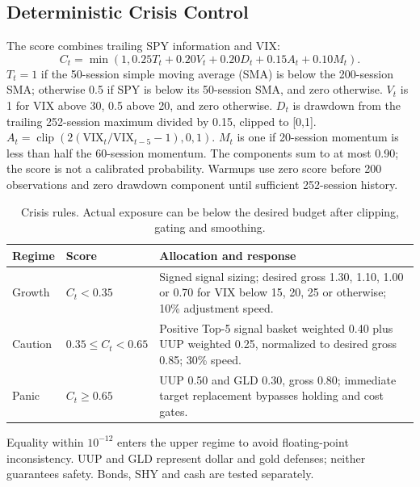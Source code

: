 \documentclass[3p,times]{elsarticle}
\begin{document}
\subsection{Deterministic Crisis Control}
The score combines trailing SPY information and VIX:
\begin{equation}C_t=\min(1,0.25T_t+0.20V_t+0.20D_t+0.15A_t+0.10M_t).\end{equation}
$T_t=1$ if the 50-session simple moving average (SMA) is below the 200-session SMA; otherwise 0.5 if SPY is below its 50-session SMA, and zero otherwise. $V_t$ is 1 for VIX above 30, 0.5 above 20, and zero otherwise. $D_t$ is drawdown from the trailing 252-session maximum divided by 0.15, clipped to [0,1]. $A_t=\operatorname{clip}(2(\mathrm{VIX}_t/\mathrm{VIX}_{t-5}-1),0,1)$. $M_t$ is one if 20-session momentum is less than half the 60-session momentum. The components sum to at most 0.90; the score is not a calibrated probability. Warmups use zero score before 200 observations and zero drawdown component until sufficient 252-session history.

\begin{table}[htbp]\centering\small
\caption{Crisis rules. Actual exposure can be below the desired budget after clipping, gating and smoothing.}\label{tab:crisis}
\begin{tabularx}{\textwidth}{llX}\toprule
Regime & Score & Allocation and response \\\midrule
Growth & $C_t<0.35$ & Signed signal sizing; desired gross 1.30, 1.10, 1.00 or 0.70 for VIX below 15, 20, 25 or otherwise; 10\% adjustment speed. \\
Caution & $0.35\le C_t<0.65$ & Positive Top-5 signal basket weighted 0.40 plus UUP weighted 0.25, normalized to desired gross 0.85; 30\% speed. \\
Panic & $C_t\ge0.65$ & UUP 0.50 and GLD 0.30, gross 0.80; immediate target replacement bypasses holding and cost gates. \\\bottomrule
\end{tabularx}\end{table}

Equality within $10^{-12}$ enters the upper regime to avoid floating-point inconsistency. UUP and GLD represent dollar and gold defenses; neither guarantees safety. Bonds, SHY and cash are tested separately.
\end{document}

